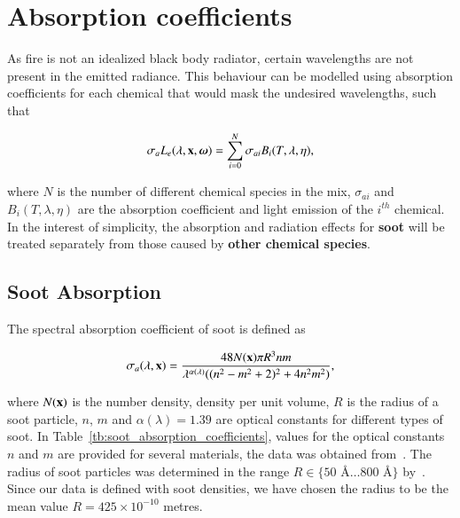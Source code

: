 \section{Absorption coefficients}
\label{sec:absorption_coefficients}

As fire is not an idealized black body radiator, certain wavelengths are not present in the emitted radiance.
This behaviour can be modelled using absorption coefficients for each chemical that would mask the undesired wavelengths, such that

\begin{equation}
\sigma_a L_e(\lambda, \mathbf{x}, \boldsymbol{\omega}) = \sum_{i = 0}^N \sigma_{ai} B_i(T, \lambda, \eta),
\end{equation}

where $N$ is the number of different chemical species in the mix, $\sigma_{ai}$ and $B_i(T, \lambda, \eta)$ are the absorption coefficient and light emission of the $i^{th}$ chemical.
In the interest of simplicity, the absorption and radiation effects for \textbf{soot} will be treated separately from those caused by \textbf{other chemical species}.

\subsection{Soot Absorption}
\label{sec:soot_absorption}

The spectral absorption coefficient of soot is defined as

\begin{equation}
\sigma_a(\lambda, \mathbf{x}) = \frac{48 N(\mathbf{x}) \pi R^3 n m}{\lambda^{\alpha(\lambda)} ((n^2 - m^2 +2)^2 + 4 n^2 m^2)},
\end{equation}

where $N(\mathbf{x})$ is the number density, density per unit volume, $R$ is the radius of a soot particle, $n$, $m$ and $\alpha(\lambda) = 1.39$ are optical constants for different types of soot.
In Table~\ref{tb:soot_absorption_coefficients}, values for the optical constants $n$ and $m$ are provided for several materials, the data was obtained from~\cite{Dalzell:1969}.
The radius of soot particles was determined in the range $R \in \lbrace 50\mbox{~\AA} \ldots 800\mbox{~\AA} \rbrace $ by~\cite{Dalzell:1969}.
Since our data is defined with soot densities, we have chosen the radius to be the mean value $R = 425 \times 10^{-10}$ metres.

